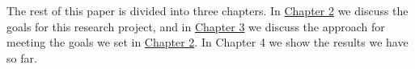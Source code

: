 The rest of this paper is divided into three chapters. In \hyperref[chp:Objectives]{Chapter 2} we discuss the goals for this research project, and in \hyperref[chp:Approach]{Chapter 3} we discuss the approach for meeting the goals we set in \hyperref[chp:Objectives]{Chapter 2}. In 
{Chapter 4} we show the results we have so far. 
\\

%
%
%			
